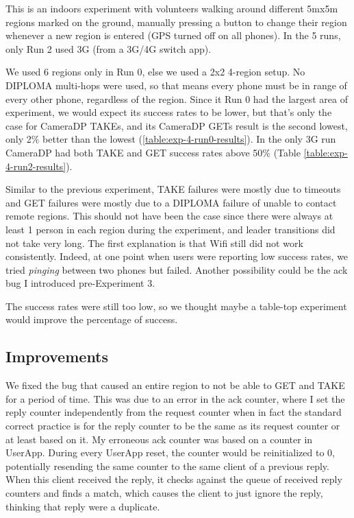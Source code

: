 This is an indoors experiment with volunteers walking around different 5mx5m regions marked on the ground, manually pressing a button to change their region whenever a new region is entered (GPS turned off on all phones). In the 5 runs, only Run 2 used 3G (from a 3G/4G switch app).

We used 6 regions only in Run 0, else we used a 2x2 4-region setup. No DIPLOMA multi-hops were used, so that means every phone must be in range of every other phone, regardless of the region. Since it Run 0 had the largest area of experiment, we would expect its success rates to be lower, but that's only the case for CameraDP TAKEs, and its CameraDP GETs result is the second lowest, only 2\% better than the lowest (\ref{table:exp-4-run0-results}). In the only 3G run CameraDP had both TAKE and GET success rates above 50\% (Table \ref{table:exp-4-run2-results}).

Similar to the previous experiment, TAKE failures were mostly due to timeouts and GET failures were mostly due to a DIPLOMA failure of unable to contact remote regions. This should not have been the case since there were always at least 1 person in each region during the experiment, and leader transitions did not take very long. The first explanation is that Wifi still did not work consistently. Indeed, at one point when users were reporting low success rates, we tried {\it pinging} between two phones but failed. Another possibility could be the ack bug I introduced pre-Experiment 3.

The success rates were still too low, so we thought maybe a table-top experiment would improve the percentage of success.

\subsection{Improvements}

We fixed the bug that caused an entire region to not be able to GET and TAKE for a period of time. This was due to an error in the ack counter, where I set the reply counter independently from the request counter when in fact the standard correct practice is for the reply counter to be the same as its request counter or at least based on it. My erroneous ack counter was based on a counter in UserApp. During every UserApp reset, the counter would be reinitialized to 0, potentially resending the same counter to the same client of a previous reply. When this client received the reply, it checks against the queue of received reply counters and finds a match, which causes the client to just ignore the reply, thinking that reply were a duplicate.

